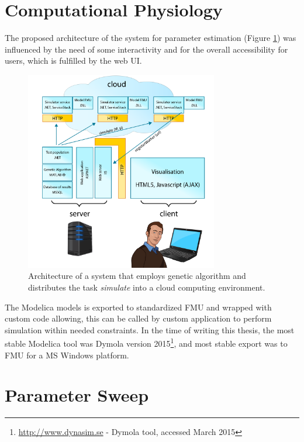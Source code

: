 \section{Computational Physiology}
\label{sec:resultsestimation}

The proposed architecture of the system for parameter estimation (Figure  \ref{fig:architectureestimation}) was influenced by the need of some interactivity and for the overall accessibility for users, which is fulfilled by the web UI. 

\begin{figure}[hbt]
    \centering
     \includegraphics[width=0.75\textwidth]{../img/chapter3-architekturaestimation-01.png}  
    \caption{Architecture of a system that employs genetic algorithm and distributes the task \emph{simulate} into a cloud computing environment.}
    \label{fig:architectureestimation}
\end{figure}

The Modelica models is exported to standardized FMU and wrapped with custom code allowing, this can be called by custom application to perform simulation within needed constraints. In the time of writing this thesis, the most stable Modelica tool was Dymola version 2015\footnote{\url{http://www.dynasim.se} - Dymola tool, accessed March 2015}, and most stable export was to FMU for a MS Windows platform. 



\section{Parameter Sweep}
\label{sec:resultsboinc}